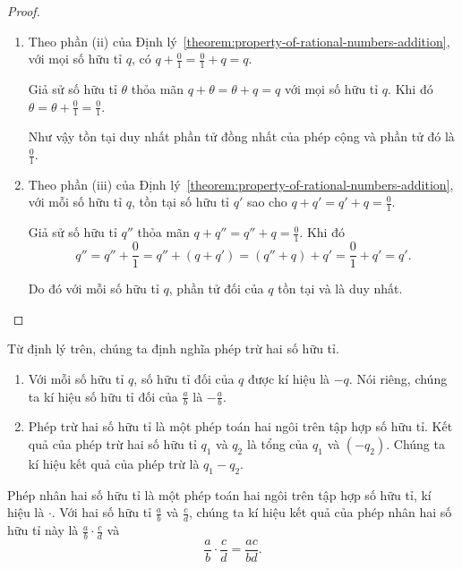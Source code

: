 \begin{proof}
    \begin{enumerate}[label={(\roman*)}]
        \item Theo phần (ii) của Định lý~\ref{theorem:property-of-rational-numbers-addition}, với mọi số hữu tỉ $q$, có $q + \frac{0}{1} = \frac{0}{1} + q = q$.

              Giả sử số hữu tỉ $\theta$ thỏa mãn $q + \theta = \theta + q = q$ với mọi số hữu tỉ $q$. Khi đó $\theta = \theta + \frac{0}{1} = \frac{0}{1}$.

              Như vậy tồn tại duy nhất phần tử đồng nhất của phép cộng và phần tử đó là $\frac{0}{1}$.
        \item Theo phần (iii) của Định lý~\ref{theorem:property-of-rational-numbers-addition}, với mỗi số hữu tỉ $q$, tồn tại số hữu tỉ $q'$ sao cho $q + q' = q' + q = \frac{0}{1}$.

              Giả sử số hữu tỉ $q''$ thỏa mãn $q + q'' = q'' + q = \frac{0}{1}$. Khi đó
              \[
                  q'' = q'' + \frac{0}{1} = q'' + (q + q') = (q'' + q) + q' = \frac{0}{1} + q' = q'.
              \]

              Do đó với mỗi số hữu tỉ $q$, phần tử đối của $q$ tồn tại và là duy nhất.
    \end{enumerate}
\end{proof}

Từ định lý trên, chúng ta định nghĩa phép trừ hai số hữu tỉ.
\begin{definition}
    \begin{enumerate}[label={(\roman*)}]
        \item Với mỗi số hữu tỉ $q$, số hữu tỉ đối của $q$ được kí hiệu là $-q$. Nói riêng, chúng ta kí hiệu số hữu tỉ đối của $\frac{a}{b}$ là $-\frac{a}{b}$.
        \item Phép trừ hai số hữu tỉ là một phép toán hai ngôi trên tập hợp số hữu tỉ. Kết quả của phép trừ hai số hữu tỉ $q_{1}$ và $q_{2}$ là tổng của $q_{1}$ và $(-q_{2})$. Chúng ta kí hiệu kết quả của phép trừ là $q_{1} - q_{2}$.
    \end{enumerate}
\end{definition}

\begin{definition}
    Phép nhân hai số hữu tỉ là một phép toán hai ngôi trên tập hợp số hữu tỉ, kí hiệu là $\cdot$. Với hai số hữu tỉ $\frac{a}{b}$ và $\frac{c}{d}$, chúng ta kí hiệu kết quả của phép nhân hai số hữu tỉ này là $\frac{a}{b}\cdot\frac{c}{d}$ và
    \[
        \frac{a}{b}\cdot\frac{c}{d} = \frac{ac}{bd}.
    \]
\end{definition}

